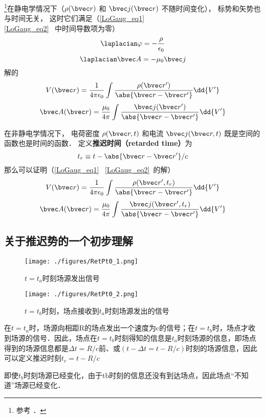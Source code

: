 

\footnote{参考 \cite{GriffE}．}在静电学情况下（$\rho(\bvec r)$ 和 $\bvec j(\bvec r)$ 不随时间变化）， 标势和矢势也与时间无关， 这时它们满足（\autoref{LoGaug_eq1}~ \autoref{LoGaug_eq2}~ 中时间导数项为零）
\begin{equation}
\laplacian \varphi = -\frac{\rho}{\epsilon_0}
\end{equation}
\begin{equation}
\laplacian \bvec A = -\mu_0 \bvec j
\end{equation}
解的
\begin{equation}
V(\bvec r) = \frac{1}{4\pi\epsilon_0} \int \frac{\rho(\bvec r')}{\abs{\bvec r - \bvec r'}} \dd{V'}
\end{equation}
\begin{equation}
\bvec A(\bvec r) = \frac{\mu_0}{4\pi} \int \frac{\bvec j(\bvec r')}{\abs{\bvec r - \bvec r'}} \dd{V'}
\end{equation}

在非静电学情况下， 电荷密度 $\rho(\bvec r, t)$ 和电流 $\bvec j(\bvec r, t)$ 既是空间的函数也是时间的函数． 定义\textbf{推迟时间（retarded time）}为
\begin{equation}
t_r \equiv t - \abs{\bvec r - \bvec r'}/c
\end{equation}
那么可以证明（\autoref{LoGaug_eq1}~ \autoref{LoGaug_eq2}~的解）
\begin{equation}
V(\bvec r) = \frac{1}{4\pi\epsilon_0} \int \frac{\rho(\bvec r', t_r)}{\abs{\bvec r - \bvec r'}} \dd{V'}
\end{equation}
\begin{equation}
\bvec A(\bvec r) = \frac{\mu_0}{4\pi} \int \frac{\bvec j(\bvec r', t_r)}{\abs{\bvec r - \bvec r'}} \dd{V'}
\end{equation}

\subsection{关于推迟势的一个初步理解}
\begin{figure}[ht]
\centering
\texttt{[image: ./figures/RetPt0\_1.png]}
\caption{$t=t_a$时刻场源发出信号} \label{RetPt0_fig1}
\end{figure}
\begin{figure}[ht]
\centering
\texttt{[image: ./figures/RetPt0\_2.png]}
\caption{$t=t_b$时刻，场点接收到$t_a$时刻场源发出的信号} \label{RetPt0_fig2}
\end{figure}

在$t=t_a$时，场源向相距R的场点发出一个速度为c的信号；在$t=t_b$时，场点才收到场源的信号．因此，场点在$t=t_b$时刻得知的信息是$t_a$时刻场源的信息，即场点得到的场源信息都是$\Delta t = R/c$前、或$(t-\Delta t = t-R/c)$时刻的场源信息，因此可以定义推迟时刻$t_r=t-R/c$

即使$t_b$时刻场源已经变化，由于tb时刻的信息还没有到达场点，因此场点“不知道”场源已经变化．